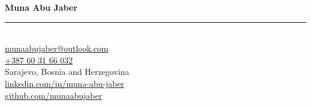 \begin{center}
    {\LARGE \textbf{Muna Abu Jaber}} \\
    \rule{\textwidth}{0.4pt} \\%
    \vspace{5pt}
    \href{mailto:munaabujaber@outlook.com}{munaabujaber@outlook.com} \\
    \href{tel:+387603166032}{+387 60 31 66 032} \\
    Sarajevo, Bosnia and Herzegovina \\
    \href{https://www.linkedin.com/in/muna-abu-jaber/}{linkedin.com/in/muna-abu-jaber} \\
    \href{https://github.com/munaabujaber}{github.com/munaabujaber}
    \vspace{15pt}
\end{center}
